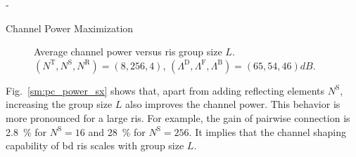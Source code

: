 \documentclass[journal]{IEEEtran}
\begin{document}
\begin{section}{-}
\begin{subsection}{Channel Power Maximization}
		\begin{figure}[!t]
			\centering
			\caption{Average channel power versus \gls{ris} group size $L$. $(N^\mathrm{T}, N^\mathrm{S}, N^\mathrm{R}) = (8, 256, 4)$, $(\Lambda^\mathrm{D}, \Lambda^\mathrm{F}, \Lambda^\mathrm{B}) = (65, 54, 46) \unit{dB}$.}
			\label{sm:pc_power_bond}
		\end{figure}
		Fig.~\ref{sm:pc_power_sx} shows that, apart from adding reflecting elements $N^\mathrm{S}$, increasing the group size $L$ also improves the channel power.
		This behavior is more pronounced for a large \gls{ris}.
		For example, the gain of pairwise connection is \qty{2.8}{\percent} for $N^\mathrm{S} = 16$ and \qty{28}{\percent} for $N^\mathrm{S} = 256$.
		It implies that the channel shaping capability of \gls{bd} \gls{ris} scales with group size $L$.


\end{subsection}
\end{section}
\end{document}

